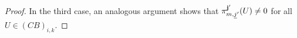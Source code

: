\documentclass{amsart}
\newcommand{\bfe}{\mathbf{e}}
\newcommand{\bff}{\mathbf{f}}
\newcommand{\bfg}{\mathbf{g}}
\newcommand{\bfh}{\mathbf{h}}
\newcommand{\tbfe}{{\tilde\bfe}}
\newcommand{\tbff}{{\tilde\bff}}
\newcommand{\tbfg}{{\tilde\bfg}}
\newcommand{\tbfh}{{\tilde\bfh}}
\newcommand{\uj}{\underline j}
\newcommand\udim{{\underline{\dim}\, }}
\begin{document}
\begin{proof}
In the third case, an analogous argument shows that $\pi^{\bf j'}_{m,\uj'}(U)\neq 0$ for all $U\in (CB)_{i,k}$.



\begin{comment}
We proceed by induction and combine the two maps $\Psi_1$ and $\Psi_2$ and obtain a map
\[\Psi:Gr^{\tilde Q}_\tbfe(\tilde P_{m+1}^{(k-1)})\to\bigsqcup_{\tbff+\tbfg+\tbfh=\tbfe} Gr^{\tilde Q}_\tbff( P(m,k))\times Gr^{\tilde Q}_\tbfg(\tau\tilde P_{m+1}^{(k)})\times Gr^{\tilde Q}_\tbfh(\tilde P_{m+1}^{(k)}).\]

By Lemma \ref{directsums} and induction hypothesis every quiver Grassmannian on the right hand side has a cell decomposition. The second part of the Proposition says that the fibres are empty if and only if $\tbfg=0$ and $\tbfh=\udim \tilde P_{m+1}^{(k)}$. In all other cases, the fiber dimension only depend on the dimension vectors $\tbff, \tbfg,\tbfh$ which means that they are constant over $Gr^{\tilde Q}_\tbff( P(m,k))\times Gr^{\tilde Q}_\tbfg(\tau\tilde P_{m+1}^{(k)})\times Gr^{\tilde Q}_\tbfh(\tilde P_{m+1}^{(k)})$\footnote{actually this should already say that this is a vector bundle as the base space is smooth (all reps are exceptional), apply Lemma \ref{vb}?}. Analogously to Lemma \ref{directsums}, we can conclude that this induces trivial bundles over every affine cell. In total, this yields a cell decomposition of the quiver Grassmannian $Gr^{\tilde Q}_\tbfe(\tilde P_{m+1}^{(k-1)})$.
\end{comment}
\end{proof}


\end{document}
